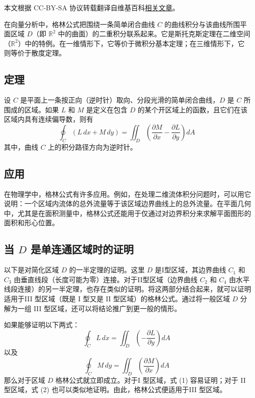 
本文根据 CC-BY-SA 协议转载翻译自维基百科\href{https://en.wikipedia.org/wiki/Green\%27s_theorem}{相关文章}。

在向量分析中，格林公式把围绕一条简单闭合曲线 $C$ 的曲线积分与该曲线所围平面区域 $D$（即 $\mathbb{R}^2$ 中的曲面）的二重积分联系起来。它是斯托克斯定理在二维空间（$\mathbb{R}^2$）中的特例。在一维情形下，它等价于微积分基本定理；在三维情形下，它则等价于散度定理。
\subsection{定理}
设 $C$ 是平面上一条按正向（逆时针）取向、分段光滑的简单闭合曲线，$D$ 是 $C$ 所围成的区域。如果 $L$ 和 $M$ 是定义在包含 $D$ 的某个开区域上的函数，且它们在该区域内具有连续偏导数，则有
$$
\oint_{C} (L\,dx + M\,dy) 
= 
\iint_{D} 
\left( 
\frac{\partial M}{\partial x} 
- 
\frac{\partial L}{\partial y} 
\right) dA~
$$
其中，曲线 $C$ 上的积分路径方向为逆时针。
\subsection{应用}
在物理学中，格林公式有许多应用。例如，在处理二维流体积分问题时，可以用它说明：一个区域内流体的总外流量等于该区域边界曲线上的总外流量。在平面几何中，尤其是在面积测量中，格林公式还能用于仅通过对边界积分来求解平面图形的面积和形心位置。
\subsection{当 $D$ 是单连通区域时的证明}
以下是对简化区域 $D$ 的一半定理的证明。这里 $D$ 是I型区域，其边界曲线 $C_1$ 和 $C_3$ 由垂直线段（长度可能为零）连接。对于II型区域（边界曲线 $C_2$ 和 $C_4$ 由水平线段连接）的另一半定理，也存在类似的证明。将这两部分结合起来，就可以证明适用于III 型区域（既是 I 型又是 II 型区域）的格林公式。通过将一般区域 $D$ 分解为一组 III 型区域，还可以将结论推广到更一般的情形。

如果能够证明以下两式：
$$
\oint_{C} L\,dx = \iint_{D} \left( -\frac{\partial L}{\partial y} \right) dA
\tag{1}~
$$
以及
$$
\oint_{C} M\,dy = \iint_{D} \left( \frac{\partial M}{\partial x} \right) dA
\tag{2}~
$$
那么对于区域 $D$ 格林公式就立即成立。对于I 型区域，式 (1) 容易证明；对于 II 型区域，式 (2) 也可以类似地证明。由此，格林公式便适用于III 型区域。
